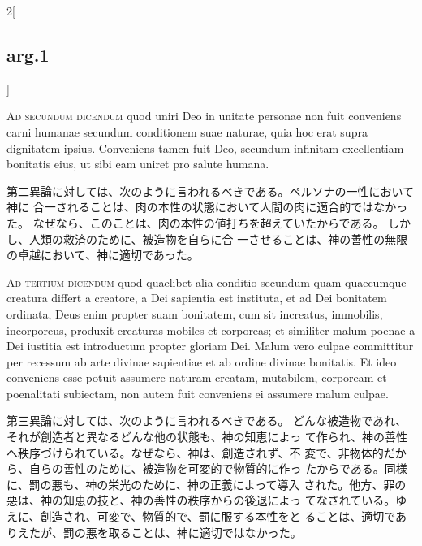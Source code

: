 \documentclass[paper=a4paper,fontsize=10pt,jafontsize=9pt,titlepage]{jlreq}
\begin{document}
\begin{paracol}{2}[\subsection{arg.1}]
\switchcolumn*[\subsection{ad.2}]

{\scshape Ad secundum dicendum} quod uniri Deo in unitate personae non fuit
conveniens carni humanae secundum conditionem suae naturae, quia hoc
erat supra dignitatem ipsius. Conveniens tamen fuit Deo, secundum
infinitam excellentiam bonitatis eius, ut sibi eam uniret pro salute
humana.

\switchcolumn

第二異論に対しては、次のように言われるべきである。ペルソナの一性において神に
 合一されることは、肉の本性の状態において人間の肉に適合的ではなかった。
 なぜなら、このことは、肉の本性の値打ちを超えていたからである。
しかし、人類の救済のために、被造物を自らに合
 一させることは、神の善性の無限の卓越において、神に適切であった。

\switchcolumn*[\subsection{ad.3}]

{\scshape Ad tertium dicendum} quod quaelibet alia conditio secundum quam
quaecumque creatura differt a creatore, a Dei sapientia est instituta,
et ad Dei bonitatem ordinata, Deus enim propter suam bonitatem, cum sit
increatus, immobilis, incorporeus, produxit creaturas mobiles et
corporeas; et similiter malum poenae a Dei iustitia est introductum
propter gloriam Dei. Malum vero culpae committitur per recessum ab arte
divinae sapientiae et ab ordine divinae bonitatis. Et ideo conveniens
esse potuit assumere naturam creatam, mutabilem, corpoream et
poenalitati subiectam, non autem fuit conveniens ei assumere malum
culpae.

\switchcolumn

第三異論に対しては、次のように言われるべきである。
どんな被造物であれ、それが創造者と異なるどんな他の状態も、神の知恵によっ
 て作られ、神の善性へ秩序づけられている。なぜなら、神は、創造されず、不
 変で、非物体的だから、自らの善性のために、被造物を可変的で物質的に作っ
 たからである。同様に、罰の悪も、神の栄光のために、神の正義によって導入
 された。他方、罪の悪は、神の知恵の技と、神の善性の秩序からの後退によっ
 てなされている。ゆえに、創造され、可変で、物質的で、罰に服する本性をと
 ることは、適切でありえたが、罰の悪を取ることは、神に適切ではなかった。

\switchcolumn*[\subsection{ad.4}]


\end{paracol}
\end{document}
